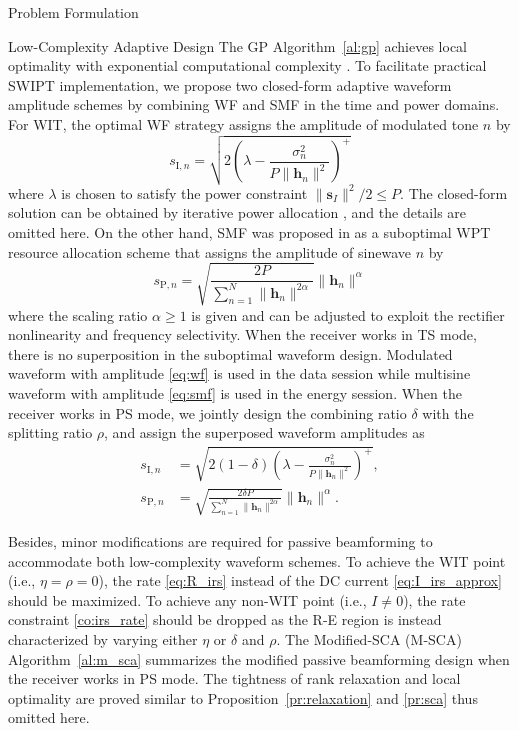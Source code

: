 \documentclass[journal]{IEEEtran}
\begin{document}
\begin{section}{Problem Formulation}
		\begin{subsection}{Low-Complexity Adaptive Design}
			The GP Algorithm~\ref{al:gp} achieves local optimality with exponential computational complexity \cite{Chiang2005}. To facilitate practical SWIPT implementation, we propose two closed-form adaptive waveform amplitude schemes by combining WF and SMF in the time and power domains. For WIT, the optimal WF strategy assigns the amplitude of modulated tone $n$ by
			\begin{equation}\label{eq:wf}
				s_{\mathrm{I}, n} = \sqrt{2\left(\lambda - \frac{\sigma_n^2}{P \lVert{\boldsymbol{h}_n}\rVert^2}\right)^+}
			\end{equation}
			where $\lambda$ is chosen to satisfy the power constraint $\lVert{\boldsymbol{s}_I}\rVert^2 / 2 \le P$. The closed-form solution can be obtained by iterative power allocation \cite{Tse2005}, and the details are omitted here. On the other hand, SMF was proposed in \cite{Clerckx2017} as a suboptimal WPT resource allocation scheme that assigns the amplitude of sinewave $n$ by
			\begin{equation}\label{eq:smf}
				s_{\mathrm{P}, n} = \sqrt{\frac{2 P}{\sum_{n=1}^N \lVert{\boldsymbol{h}_n \rVert^{2 \alpha}}}}\lVert{\boldsymbol{h}_n}\rVert^\alpha
			\end{equation}
			where the scaling ratio $\alpha \ge 1$ is given and can be adjusted to exploit the rectifier nonlinearity and frequency selectivity. When the receiver works in TS mode, there is no superposition in the suboptimal waveform design. Modulated waveform with amplitude \eqref{eq:wf} is used in the data session while multisine waveform with amplitude \eqref{eq:smf} is used in the energy session. When the receiver works in PS mode, we jointly design the combining ratio $\delta$ with the splitting ratio $\rho$, and assign the superposed waveform amplitudes as
			\begin{align}
				s_{\mathrm{I}, n} &= \sqrt{2(1 - \delta)\left(\lambda - \frac{\sigma_n^2}{P \lVert{\boldsymbol{h}_n}\rVert^2}\right)^+}, \label{eq:s_i}\\
				s_{\mathrm{P}, n} &= \sqrt{\frac{2 \delta P}{\sum_{n=1}^N \lVert{\boldsymbol{h}_n \rVert^{2 \alpha}}}}\lVert{\boldsymbol{h}_n}\rVert^\alpha. \label{eq:s_p}
			\end{align}

			Besides, minor modifications are required for passive beamforming to accommodate both low-complexity waveform schemes. To achieve the WIT point (i.e., $\eta=\rho=0$), the rate \eqref{eq:R_irs} instead of the DC current \eqref{eq:I_irs_approx} should be maximized. To achieve any non-WIT point (i.e., $I \ne 0$), the rate constraint \eqref{co:irs_rate} should be dropped as the R-E region is instead characterized by varying either $\eta$ or $\delta$ and $\rho$. The Modified-SCA (M-SCA) Algorithm~\ref{al:m_sca} summarizes the modified passive beamforming design when the receiver works in PS mode. The tightness of rank relaxation and local optimality are proved similar to Proposition~\ref{pr:relaxation} and \ref{pr:sca} thus omitted here.


\end{subsection}
\end{section}
\end{document}
